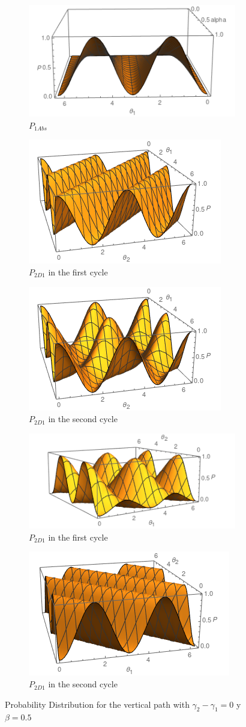 \documentclass[11pt]{article}
\begin{document}
\begin{figure}[h!]
\centering
\begin{subfigure}[b]{0.40\linewidth}
\includegraphics[width=\linewidth,height=3.5 cm]{pcabs.png}
\caption{$P_{1Abs}$}
\label{fig:BS1}
\end{subfigure}
\begin{subfigure}[b]{0.40\linewidth}
\includegraphics[width=\linewidth,height=3.5 cm]{pcd21.png}
\caption{$P_{2D1}$ in the first cycle }
\label{fig:BS1}
\end{subfigure}
\begin{subfigure}[b]{0.40\linewidth}
\includegraphics[width=\linewidth,height=3.5 cm]{pcd22.png}
\caption{$P_{2D1}$ in the second cycle}
\label{fig:BS1}
\end{subfigure}
\begin{subfigure}[b]{0.40\linewidth}
\includegraphics[width=\linewidth,height=3.5 cm]{pcd11.png}
\caption{$P_{2D1} $ in the first cycle}
\label{fig:westminster_aerea}
\end{subfigure}
\begin{subfigure}[b]{0.40\linewidth}
\includegraphics[width=\linewidth,height=3.5 cm]{pcd12.png}
\caption{$P_{2D1} $ in the second cycle }
\label{fig:BS1}
\end{subfigure}
\caption{Probability Distribution for the vertical path with  $\gamma_{2}-\gamma_{1}=0 $ y $\beta=0.5$}
\label{fig:westminster}
\end{figure}
\end{document}
